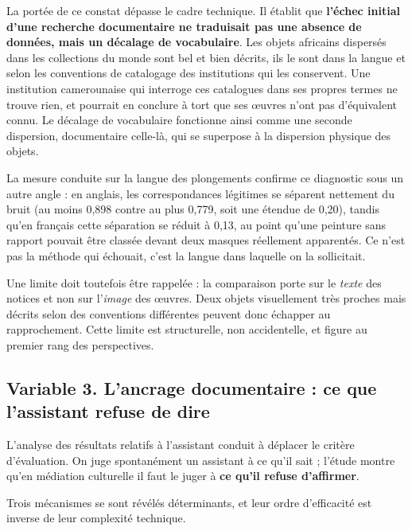 La portée de ce constat dépasse le cadre technique. Il établit que
\textbf{l'échec initial d'une recherche documentaire ne traduisait pas une
absence de données, mais un décalage de vocabulaire}. Les objets africains
dispersés dans les collections du monde sont bel et bien décrits, ils le sont
dans la langue et selon les conventions de catalogage des institutions qui les
conservent. Une institution camerounaise qui interroge ces catalogues dans ses
propres termes ne trouve rien, et pourrait en conclure à tort que ses œuvres
n'ont pas d'équivalent connu. Le décalage de vocabulaire fonctionne ainsi comme
une seconde dispersion, documentaire celle-là, qui se superpose à la dispersion
physique des objets.

La mesure conduite sur la langue des plongements confirme ce diagnostic sous un
autre angle : en anglais, les correspondances légitimes se séparent nettement du
bruit (au moins 0,898 contre au plus 0,779, soit une étendue de 0,20), tandis
qu'en français cette séparation se réduit à 0,13, au point qu'une peinture sans
rapport pouvait être classée devant deux masques réellement apparentés. Ce n'est
pas la méthode qui échouait, c'est la langue dans laquelle on la sollicitait.

Une limite doit toutefois être rappelée : la comparaison porte sur le
\emph{texte} des notices et non sur l'\emph{image} des œuvres. Deux objets
visuellement très proches mais décrits selon des conventions différentes peuvent
donc échapper au rapprochement. Cette limite est structurelle, non accidentelle,
et figure au premier rang des perspectives.

\subsection{Variable 3. L'ancrage documentaire : ce que l'assistant refuse de dire}

L'analyse des résultats relatifs à l'assistant conduit à déplacer le critère
d'évaluation. On juge spontanément un assistant à ce qu'il sait ; l'étude montre
qu'en médiation culturelle il faut le juger à \textbf{ce qu'il refuse
d'affirmer}.

Trois mécanismes se sont révélés déterminants, et leur ordre d'efficacité est
inverse de leur complexité technique.

